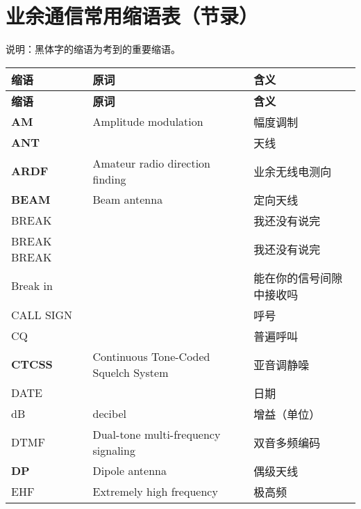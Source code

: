 \newpage

\section{业余通信常用缩语表（节录）}

说明：黑体字的缩语为考到的重要缩语。

\begin{longtable}[l]{lll}
  \textbf{缩语}    & \textbf{原词}                          & \textbf{含义}         \\
  \endfirsthead
  \textbf{缩语}    & \textbf{原词}                          & \textbf{含义}         \\
  \endhead
  \textbf{AM}    & Amplitude modulation                 & 幅度调制                \\
  \textbf{ANT}   &                                      & 天线                  \\
  \textbf{ARDF}  & Amateur radio direction finding      & 业余无线电测向             \\
  \textbf{BEAM}  & Beam antenna                         & 定向天线                \\
  BREAK          &                                      & 我还没有说完              \\
  BREAK BREAK    &                                      & 我还没有说完              \\
  Break in       &                                      & 能在你的信号间隙中接收吗        \\
  CALL SIGN      &                                      & 呼号                  \\
  CQ             &                                      & 普遍呼叫                \\
  \textbf{CTCSS} & Continuous Tone-Coded Squelch System & 亚音调静噪               \\
  DATE           &                                      & 日期                  \\
  dB             & decibel                              & 增益（单位）              \\
  DTMF           & Dual-tone multi-frequency signaling  & 双音多频编码              \\
  \textbf{DP}    & Dipole antenna                       & 偶级天线                \\
  EHF            & Extremely high frequency             & 极高频                 \\

\end{longtable}
